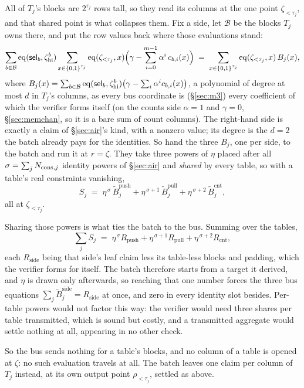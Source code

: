 All of $T_j$'s blocks are $2^{\tau_j}$ rows tall, so they read its columns at the one point $\zeta_{<\tau_j}$, and that shared point is what collapses them. Fix a side, let $\mathcal B$ be the blocks $T_j$ owns there, and put the row values back where those evaluations stand:
\[
  \sum_{b\in\mathcal B}\operatorname{eq}(\mathsf{sel}_b,\zeta^{b}_{\mathrm{hi}})\sum_{x\in\{0,1\}^{\tau_j}}\operatorname{eq}(\zeta_{<\tau_j},x)\Bigl(\gamma-\sum_{i=0}^{m-1}\alpha^{i}\,c_{b,i}(x)\Bigr)
  \;=\;\sum_{x\in\{0,1\}^{\tau_j}}\operatorname{eq}(\zeta_{<\tau_j},x)\,B_j(x),
\]
where $B_j(x)=\sum_{b\in\mathcal B}\operatorname{eq}(\mathsf{sel}_b,\zeta^{b}_{\mathrm{hi}})\bigl(\gamma-\sum_i\alpha^{i}c_{b,i}(x)\bigr)$, a polynomial of degree at most $d$ in $T_j$'s columns, as every bus coordinate is (\S\ref{sec:m3}) every coefficient of which the verifier forms itself (on the counts side $\alpha=1$ and $\gamma=0$, \S\ref{sec:memchan}, so it is a bare sum of count columns). The right-hand side is exactly a claim of \S\ref{sec:air}'s kind, with a nonzero value; its degree is the $d=2$ the batch already pays for the identities. So hand the three $B_j$, one per side, to the batch and run it at $r=\zeta$. They take three powers of $\eta$ placed after all $\sigma=\sum_jN_{\mathrm{cons},j}$ identity powers of \S\ref{sec:air} and \emph{shared} by every table, so with a table's real constraints vanishing,
\[
  S_j\;=\;\eta^{\,\sigma}\,\widetilde B^{\mathrm{push}}_j+\eta^{\,\sigma+1}\,\widetilde B^{\mathrm{pull}}_j+\eta^{\,\sigma+2}\,\widetilde B^{\mathrm{cnt}}_j ,
\]
all at $\zeta_{<\tau_j}$.

Sharing those powers is what ties the batch to the bus. Summing over the tables,
\[
  \sum_j S_j\;=\;\eta^{\,\sigma}R_{\mathrm{push}}+\eta^{\,\sigma+1}R_{\mathrm{pull}}+\eta^{\,\sigma+2}R_{\mathrm{cnt}} ,
\]
each $R_{\mathrm{side}}$ being that side's leaf claim less its table-less blocks and padding, which the verifier forms for itself. The batch therefore starts from a target it derived, and $\eta$ is drawn only afterwards, so reaching that one number forces the three bus equations $\sum_j\widetilde B^{\mathrm{side}}_j=R_{\mathrm{side}}$ at once, and zero in every identity slot besides. Per-table powers would not factor this way: the verifier would need three shares per table transmitted, which is sound but costly, and a transmitted aggregate would settle nothing at all, appearing in no other check.

So the bus sends nothing for a table's blocks, and no column of a table is opened at $\zeta$: no such evaluation travels at all. The batch leaves one claim per column of $T_j$ instead, at its own output point $\rho_{<\tau_j}$, settled as above.

